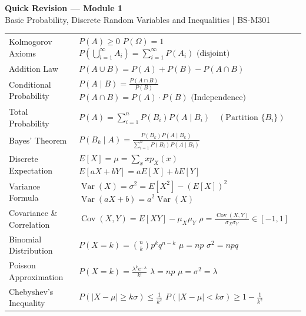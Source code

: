 \documentclass[12pt,a4paper]{article}
\renewcommand{\arraystretch}{1.45}
\begin{document}
\newpage
\begin{center}
  {\large\bfseries\color{myred} Quick Revision --- Module 1}\\[3pt]
  {\small\color{mydark} Basic Probability, Discrete Random Variables and Inequalities $|$ BS-M301}
\end{center}
\noindent{\color{myred}\rule{\linewidth}{1.2pt}}
\vspace{2pt}

\begin{tcolorbox}[formulabox, title={\textbf{Key Formulas and Probability Identities at a Glance}}]
\renewcommand{\arraystretch}{1.35}
\setlength{\tabcolsep}{5pt}
\noindent\begin{tabularx}{\linewidth}{B{3.5cm} Y}
Kolmogorov Axioms & $P(A) \ge 0$ \newline $P(\Omega) = 1$ \newline $P\left(\bigcup_{i=1}^\infty A_i\right) = \sum_{i=1}^\infty P(A_i) \text{ (disjoint)}$ \\[3pt]
Addition Law & $P(A \cup B) = P(A) + P(B) - P(A \cap B)$ \\[3pt]
Conditional Probability & $P(A \mid B) = \frac{P(A \cap B)}{P(B)}$ \newline $P(A \cap B) = P(A) \cdot P(B) \text{ (Independence)}$ \\[3pt]
Total Probability & $P(A) = \sum_{i=1}^n P(B_i) P(A \mid B_i) \quad (\text{Partition } \{B_i\})$ \\[3pt]
Bayes' Theorem & $P(B_k \mid A) = \frac{P(B_k) P(A \mid B_k)}{\sum_{i=1}^n P(B_i) P(A \mid B_i)}$ \\[3pt]
Discrete Expectation & $E[X] = \mu = \sum_x x p_X(x)$ \newline $E[aX + bY] = aE[X] + bE[Y]$ \\[3pt]
Variance Formula & $\operatorname{Var}(X) = \sigma^2 = E[X^2] - (E[X])^2$ \newline $\operatorname{Var}(aX+b) = a^2 \operatorname{Var}(X)$ \\[3pt]
Covariance \& Correlation & $\operatorname{Cov}(X,Y) = E[XY] - \mu_X \mu_Y$ \newline $\rho = \frac{\operatorname{Cov}(X,Y)}{\sigma_X \sigma_Y} \in [-1, 1]$ \\[3pt]
Binomial Distribution & $P(X=k) = \binom{n}{k} p^k q^{n-k}$ \newline $\mu = np$ \quad $\sigma^2 = npq$ \\[3pt]
Poisson Approximation & $P(X=k) = \frac{\lambda^k e^{-\lambda}}{k!}$ \newline $\lambda = np$ \newline $\mu = \sigma^2 = \lambda$ \\[3pt]
Chebyshev's Inequality & $P(|X - \mu| \ge k\sigma) \le \frac{1}{k^2}$ \newline $P(|X - \mu| < k\sigma) \ge 1 - \frac{1}{k^2}$ \\[3pt]
\end{tabularx}\par
\end{tcolorbox}
\end{document}
